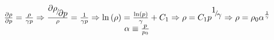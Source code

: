 \begin{equation}
\label{eq:rarefaction-density}
\begin{array}{c}
\frac{{\partial \rho }}{{\partial p}} = \frac{\rho }{{\gamma p}} \Rightarrow \frac{{{\raise0.7ex\hbox{${\partial \rho }$} \!\mathord{\left/
 {\vphantom {{\partial \rho } {\partial p}}}\right.\kern-\nulldelimiterspace}
\!\lower0.7ex\hbox{${\partial p}$}}}}{\rho } = \frac{1}{{\gamma p}} \Rightarrow \ln \left( \rho  \right) = \frac{{\ln \left( p \right)}}{\gamma } + {C_1} \Rightarrow \rho  = {C_1}{p^{{\raise0.7ex\hbox{$1$} \!\mathord{\left/
 {\vphantom {1 \gamma }}\right.\kern-\nulldelimiterspace}
\!\lower0.7ex\hbox{$\gamma $}}}} \Rightarrow \rho  = {\rho _0}{\alpha ^{\frac{1}{\gamma }}}\\
\alpha  \equiv \frac{p}{{{p_0}}}
\end{array}
\end{equation}


